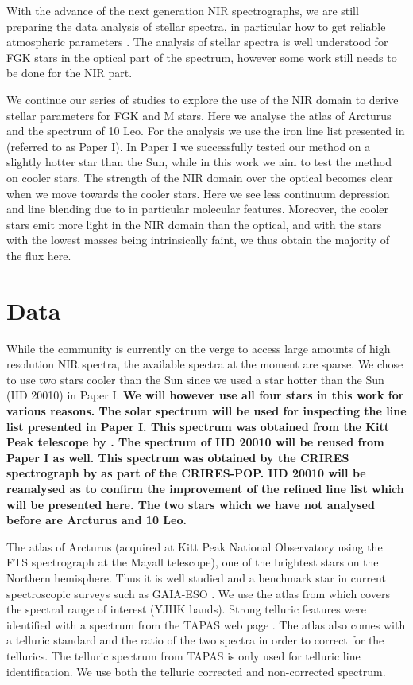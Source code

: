 \documentclass{aa}
\begin{document}
With the advance of the next generation NIR spectrographs, we are still
preparing the data analysis of stellar spectra, in particular how to get
reliable atmospheric parameters \citep[see e.g.][]{Onehag2012,Lindgren2016,Andreasen2016}.
The analysis of stellar spectra is well understood for FGK stars in the optical
part of the spectrum, however some work still needs to be done for the NIR part.

We continue our series of studies to explore the use of the NIR domain to derive
stellar parameters for FGK and M stars. Here we analyse the atlas of Arcturus
and the spectrum of 10 Leo. For the analysis we use the iron line list presented
in \citet{Andreasen2016} (referred to as Paper I). In Paper I we successfully
tested our method on a slightly hotter star than the Sun, while in this work we
aim to test the method on cooler stars. The strength of the NIR domain over the
optical becomes clear when we move towards the cooler stars. Here we see less
continuum depression and line blending due to in particular molecular features.
Moreover, the cooler stars emit more light in the NIR domain than the optical,
and with the stars with the lowest masses being intrinsically faint, we thus
obtain the majority of the flux here.



\section{Data}
\label{sec:data}

While the community is currently on the verge to access large amounts of high
resolution NIR spectra, the available spectra at the moment are sparse. We chose
to use two stars cooler than the Sun since we used a star hotter than the Sun
(HD 20010) in Paper I. {\bf We will however use all four stars in this work for
various reasons. The solar spectrum will be used for inspecting the line list
presented in Paper I. This spectrum was obtained from the Kitt Peak telescope by
\citet{Hinkle1995}. The spectrum of HD 20010 will be reused from Paper I as
well. This spectrum was obtained by the CRIRES spectrograph by
\citet{Lebzelter2012} as part of the CRIRES-POP. HD 20010 will be reanalysed as
to confirm the improvement of the refined line list which will be presented
here. The two stars which we have not analysed before are Arcturus and 10 Leo.}

The atlas of Arcturus (acquired at Kitt Peak National Observatory using the FTS
spectrograph at the Mayall telescope), one of the brightest stars on the
Northern hemisphere. Thus it is well studied \citep[see e.g.][to mention just a
few]{Griffin1967,McWilliam1990,Ramirez2013} and a benchmark star in current
spectroscopic surveys such as GAIA-ESO \citep{}. We use the atlas from
\cite{Hinkle1995a} which covers the spectral range of interest (YJHK bands).
Strong telluric features were identified with a spectrum from the TAPAS web page
\citep{Bertaux2014}. The atlas also comes with a telluric standard and the ratio
of the two spectra in order to correct for the tellurics. The telluric spectrum
from TAPAS is only used for telluric line identification. We use both the
telluric corrected and non-corrected spectrum.
\end{document}
